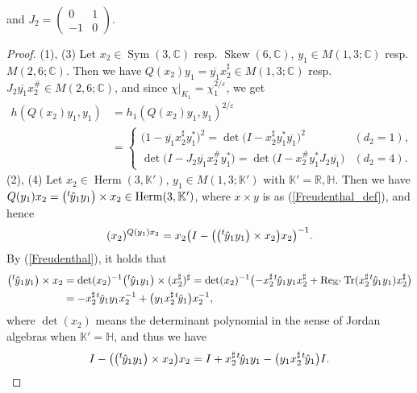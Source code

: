 \documentclass[pdftex]{sigma}
\numberwithin{equation}{section}
\newcommand{\BR}{\mathbb{R}}
\newcommand{\BC}{\mathbb{C}}
\newcommand{\BH}{\mathbb{H}}
\newcommand{\BK}{\mathbb{K}}
\newcommand{\Tr}{\operatorname{Tr}}
\newcommand{\Sym}{\operatorname{Sym}}
\newcommand{\Skew}{\operatorname{Skew}}
\newcommand{\Herm}{\operatorname{Herm}}
\renewcommand{\Re}{\operatorname{Re}}
\begin{document}
and $J_2=\left(\begin{smallmatrix}0&1\\-1&0\end{smallmatrix}\right)$.
\begin{proof}
(1), (3) Let $x_2\in \Sym(3,\BC)$ resp. $\Skew(6,\BC)$, $y_1\in M(1,3;\BC)$ resp. $M(2,6;\BC)$.
Then we have $Q(x_2)y_1=\overline{y_1}x_2^\sharp\in M(1,3;\BC)$ resp.~$J_2\overline{y_1}x_2^\#\in M(2,6;\BC)$,
and since $\chi|_{K_1}=\chi_1^{2/\varepsilon}$, we get
\begin{align*}
h(Q(x_2)y_1,y_1)&=h_1(Q(x_2)y_1,y_1)^{2/\varepsilon} \\
&=\begin{cases} \big(1-\overline{y_1}x_2^\sharp y_1^*\big)^2=\det\big(I-x_2^\sharp y_1^*\overline{y_1}\big)^2 & (d_2=1), \\
\det\big(I-J_2\overline{y_1}x_2^\#y_1^*\big)=\det\big(I-x_2^\#y_1^*J_2\overline{y_1}\big) & (d_2=4). \end{cases}
\end{align*}
(2), (4) Let $x_2\in \Herm(3,\BK')$, $y_1\in M(1,3;\BK')$ with $\BK'=\BR,\BH$.
Then we have $Q(y_1)x_2=\big({}^t\hspace{-1pt}\hat{y}_1y_1\big)\times x_2\in\Herm(3,\BK')$,
where $x\times y$ is as (\ref{Freudenthal_def}), and hence
\begin{gather*} (x_2)^{Q(y_1)x_2}=x_2\big(I-\big(\big({}^t\hspace{-1pt}\hat{y}_1y_1\big)\times x_2\big)x_2\big)^{-1}. \end{gather*}
By (\ref{Freudenthal}), it holds that
\begin{align*}
\big({}^t\hspace{-1pt}\hat{y}_1y_1\big)\times x_2&=\det(x_2)^{-1}\big({}^t\hspace{-1pt}\hat{y}_1y_1\big)\times(x_2^\sharp)^\sharp
 =\det(x_2)^{-1}\big({-}x_2^\sharp{}^t\hspace{-1pt}\hat{y}_1y_1x_2^\sharp +\Re_{\BK'}\Tr(x_2^\sharp{}^t\hspace{-1pt}\hat{y}_1y_1)x_2^\sharp\big) \\
& =-x_2^\sharp{}^t\hspace{-1pt}\hat{y}_1y_1x_2^{-1}+\big(y_1x_2^\sharp{}^t\hspace{-1pt}\hat{y}_1\big)x_2^{-1},
\end{align*}
where $\det(x_2)$ means the determinant polynomial in the sense of Jordan algebras when $\BK'=\BH$, and thus we have
\begin{gather*} I-\big(\big({}^t\hspace{-1pt}\hat{y}_1y_1\big)\times x_2\big)x_2=I+x_2^\sharp{}^t\hspace{-1pt}\hat{y}_1y_1-\big(y_1x_2^\sharp{}^t\hspace{-1pt}\hat{y}_1\big)I. \end{gather*}

\end{proof}
\end{document}
